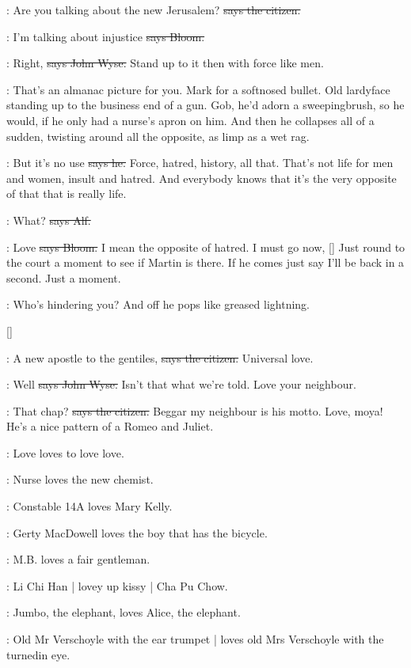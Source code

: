 \citizen:
Are you talking about the new Jerusalem?
\sout{says the citizen.}

\Bloom:
I'm talking about injustice
\sout{says Bloom.}

\johnwyse:
Right,
\sout{says John Wyse.}
Stand up to it then with force like men.

\Nq:
That's an almanac picture for you.
Mark for a softnosed bullet.
Old lardyface standing up to the business end of a gun.
Gob,
he'd adorn a sweepingbrush,
so he would,
if he only had a nurse's apron on him.
And then he collapses all of a sudden,
twisting around all the opposite,
as limp as a wet rag.%

\Bloom:
But it's no use
\sout{says he.}
Force,
hatred,
history,
all that.
That's not life for men and women,
insult and hatred.
And everybody knows that it's the very opposite of that that is really life.

\bergan:
What?
\sout{says Alf.}

\Bloom:
Love
\sout{says Bloom.}
I mean the opposite of hatred.
I must go now,
[]
Just round to the court a moment to see if Martin is there.
If he comes just say I'll be back in a second.
Just a moment.

\Nq:
Who's hindering you?
And off he pops like greased lightning.

[]

\citizen:
A new apostle to the gentiles,
\sout{says the citizen.}
Universal love.

\johnwyse:
Well
\sout{says John Wyse.}
Isn't that what we're told.
Love your neighbour.

\citizen:
That chap?
\sout{says the citizen.}
Beggar my neighbour is his motto.
Love,
moya!
He's a nice pattern of a Romeo and Juliet.

:
Love loves to love love.

:
Nurse loves the new chemist.

:
Constable 14A loves Mary Kelly.

:
Gerty MacDowell loves the boy that has the bicycle.

:
M.B. loves a fair gentleman.

:
Li Chi Han |
lovey up kissy |
Cha Pu Chow.

:
Jumbo, the elephant,
loves Alice, the elephant.

:
Old Mr Verschoyle with the ear trumpet |
loves old Mrs Verschoyle with the turnedin eye.

